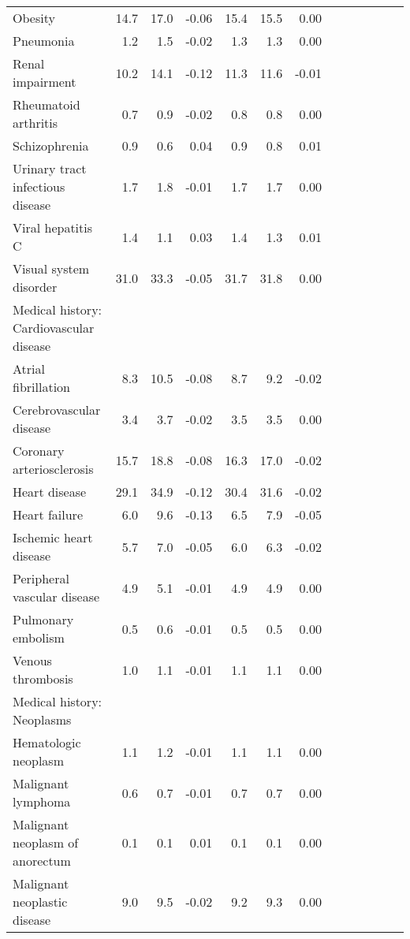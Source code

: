 \documentclass[11pt,]{article}
\begin{document}
\begin{longtable}{lrrrrrrrrrrrr}
      Obesity & 14.7 & 17.0 & -0.06 & 15.4 & 15.5 &  0.00 \\ 
      Pneumonia &  1.2 &  1.5 & -0.02 &  1.3 &  1.3 &  0.00 \\ 
      Renal impairment & 10.2 & 14.1 & -0.12 & 11.3 & 11.6 & -0.01 \\ 
      Rheumatoid arthritis &  0.7 &  0.9 & -0.02 &  0.8 &  0.8 &  0.00 \\ 
      Schizophrenia &  0.9 &  0.6 &  0.04 &  0.9 &  0.8 &  0.01 \\ 
      Urinary tract infectious disease &  1.7 &  1.8 & -0.01 &  1.7 &  1.7 &  0.00 \\ 
      Viral hepatitis C &  1.4 &  1.1 &  0.03 &  1.4 &  1.3 &  0.01 \\ 
      Visual system disorder & 31.0 & 33.3 & -0.05 & 31.7 & 31.8 &  0.00 \\ 
  Medical history: Cardiovascular disease &    &    &     &    &    &     \\ 
      Atrial fibrillation &  8.3 & 10.5 & -0.08 &  8.7 &  9.2 & -0.02 \\ 
      Cerebrovascular disease &  3.4 &  3.7 & -0.02 &  3.5 &  3.5 &  0.00 \\ 
      Coronary arteriosclerosis & 15.7 & 18.8 & -0.08 & 16.3 & 17.0 & -0.02 \\ 
      Heart disease & 29.1 & 34.9 & -0.12 & 30.4 & 31.6 & -0.02 \\ 
      Heart failure &  6.0 &  9.6 & -0.13 &  6.5 &  7.9 & -0.05 \\ 
      Ischemic heart disease &  5.7 &  7.0 & -0.05 &  6.0 &  6.3 & -0.02 \\ 
      Peripheral vascular disease &  4.9 &  5.1 & -0.01 &  4.9 &  4.9 &  0.00 \\ 
      Pulmonary embolism &  0.5 &  0.6 & -0.01 &  0.5 &  0.5 &  0.00 \\ 
      Venous thrombosis &  1.0 &  1.1 & -0.01 &  1.1 &  1.1 &  0.00 \\ 
  Medical history: Neoplasms &    &    &     &    &    &     \\ 
      Hematologic neoplasm &  1.1 &  1.2 & -0.01 &  1.1 &  1.1 &  0.00 \\ 
      Malignant lymphoma &  0.6 &  0.7 & -0.01 &  0.7 &  0.7 &  0.00 \\ 
      Malignant neoplasm of anorectum &  0.1 &  0.1 &  0.01 &  0.1 &  0.1 &  0.00 \\ 
      Malignant neoplastic disease &  9.0 &  9.5 & -0.02 &  9.2 &  9.3 &  0.00 \\ 

\end{longtable}
\end{document}
